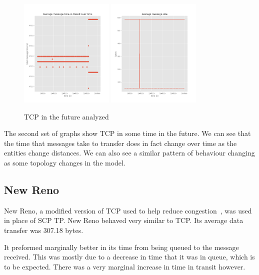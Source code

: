 \documentclass[a4paper,12pt]{article}
\begin{document}
\begin{figure}[h]
  \centering
  \includegraphics[width=0.4\textwidth]{media/tcp_future.png}
  \includegraphics[width=0.4\textwidth]{media/tcp_future_data.png}
  \caption{TCP in the future analyzed}
\end{figure}

The second set of graphs show TCP in some time in the future. We can see that
the time that messages take to transfer does in fact change over time as the
entities change distances. We can also see a similar pattern of behaviour
changing as some topology changes in the model.

\subsection{New Reno}

New Reno, a modified version of TCP used to help reduce
congestion~\cite{Nahar2016}, was used in place of SCP TP. New Reno behaved very
similar to TCP. Its average data transfer was 307.18 bytes.

It preformed marginally better in its time from being queued to the message
received. This was mostly due to a decrease in time that it was in queue, which
is to be expected. There was a very marginal increase in time in transit
however.
\end{document}
